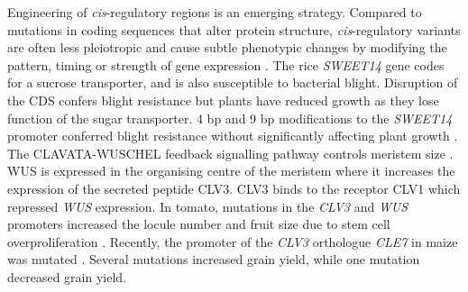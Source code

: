 \documentclass[../main.tex]{subfiles}
\begin{document}
Engineering of \textit{cis}\hyp{}regulatory regions is an emerging strategy.
Compared to mutations in coding sequences that alter protein structure, \textit{cis}\hyp{}regulatory variants are often less pleiotropic and cause subtle phenotypic changes by modifying the pattern, timing or strength of gene expression \autocite{wittkoppCisregulatoryElementsMolecular2012}.
The rice \textit{SWEET14} gene codes for a sucrose transporter, and is also susceptible to bacterial blight.
Disruption of the CDS confers blight resistance but plants have reduced growth as they lose function of the sugar transporter.
4 bp and 9 bp modifications to the \textit{SWEET14} promoter conferred blight resistance without significantly affecting plant growth \autocite{liHighefficiencyTALENbasedGene2012}.
The CLAVATA-WUSCHEL feedback signalling pathway controls meristem size \autocite{somssichCLAVATAWUSCHELSignalingShoot2016}.
WUS is expressed in the organising centre of the meristem where it increases the expression of the secreted peptide CLV3.
CLV3 binds to the receptor CLV1 which repressed \textit{WUS} expression.
In tomato, mutations in the \textit{CLV3} and \textit{WUS} promoters increased the locule number and fruit size due to stem cell overproliferation \autocite{rodriguez-lealEngineeringQuantitativeTrait2017}.
Recently, the promoter of the \textit{CLV3} orthologue \textit{CLE7} in maize was mutated \autocite{liuEnhancingGrainyieldrelatedTraits2021}.
Several mutations increased grain yield, while one mutation decreased grain yield.
\end{document}
